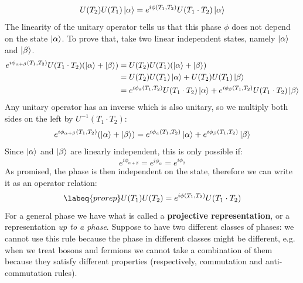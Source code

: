 \documentclass[../main.tex]{subfiles}
\begin{document}
\[
U(T_2)U(T_1)\ket{\alpha}=e^{i\phi(T_1,T_2)}U(T_1\cdot T_2)\ket{\alpha}
\]
The linearity of the unitary operator tells us that this phase $\phi$ does not depend on the state $\ket{\alpha}$. To prove that, take two linear independent states, namely $\ket{\alpha}$ and $\ket{\beta}$.
\begin{align*}
e^{i\phi_{\alpha+\beta}(T_1,T_2)}U(T_1\cdot T_2)(\ket{\alpha}+\ket{\beta})&=U(T_2)U(T_1)(\ket{\alpha}+\ket{\beta})\\
&=U(T_2)U(T_1)\ket{\alpha}+U(T_2)U(T_1)\ket{\beta}\\
&=e^{i\phi_a(T_1,T_2)}U(T_1\cdot T_2)\ket{\alpha}+e^{i\phi_\beta(T_1,T_2)}U(T_1\cdot T_2)\ket{\beta}
\end{align*}
Any unitary operator has an inverse which is also unitary, so we multiply both sides on the left by $U^{-1}(T_1\cdot T_2)$:
\[
e^{i\phi_{\alpha+\beta}(T_1,T_2)}(\ket{\alpha}+\ket{\beta})=e^{i\phi_a(T_1,T_2)}\ket{\alpha}+e^{i\phi_\beta(T_1,T_2)}\ket{\beta}
\]
Since $\ket{\alpha}$ and $\ket{\beta}$ are linearly independent, this is only possible if:
\[
e^{i\phi_{\alpha+\beta}}=e^{i\phi_\alpha}=e^{i\phi_\beta}
\]
As promised, the phase is then independent on the state, therefore we can write it as an operator relation:
\begin{equation}
\labeq{prorep}
U(T_1)U(T_2)=e^{i\phi(T_1,T_2)}U(T_1\cdot T_2)
\end{equation}
For a general phase we have what is called a \textbf{projective representation}, or a representation \textit{up to a phase}. Suppose to have two different classes of phases: we cannot use this rule because the phase in different classes might be different, e.g. when we treat bosons and fermions we cannot take a combination of them because they satisfy different properties (respectively, commutation and anti-commutation rules).
\end{document}

